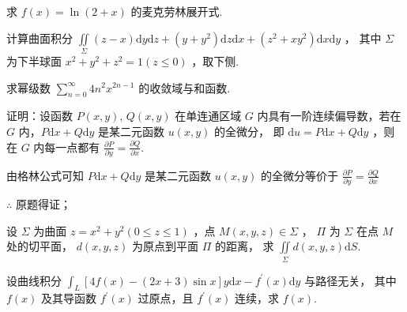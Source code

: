 \begin{problem}[points = 8]
求 $f(x) = \ln{(2 + x)}$ 的麦克劳林展开式.
\end{problem}

\begin{problem}[points = 8]
计算曲面积分 $\iint\limits_\Sigma (z - x)\mathrm{d}y\mathrm{d}z + (y + y^2)\mathrm{d}z\mathrm{d}x + (z^2 + xy^2)\mathrm{d}x\mathrm{d}y$ ，
其中 $\Sigma$ 为下半球面 $x^2 + y^2 + z^2 = 1(z \leq 0)$ ，取下侧.
\end{problem}

\begin{problem}[points = 8]
求幂级数 $\sum\limits_{n = 0}^{\infty} 4n^2x^{2n - 1}$ 的收敛域与和函数.
\end{problem}

\begin{problem}[points = 5]
证明：设函数 $P(x, y),\, Q(x, y)$ 在单连通区域 $G$ 内具有一阶连续偏导数，若在 $G$ 内，$P\mathrm{d}x + Q\mathrm{d}y$ 是某二元函数 $u(x, y)$ 的全微分，
即 $\mathrm{d}u = P\mathrm{d}x + Q\mathrm{d}y$ ，则在 $G$ 内每一点都有 $\frac{\partial P}{\partial y} = \frac{\partial Q}{\partial x}$.
\end{problem}
\begin{solution}
    由格林公式可知 $P\mathrm{d}x + Q\mathrm{d}y$ 是某二元函数 $u(x, y)$ 的全微分等价于 $\frac{\partial P}{\partial y} = \frac{\partial Q}{\partial x}$

    $\therefore$ 原题得证；
\end{solution}

\begin{problem}[points = 6]
设 $\Sigma$ 为曲面 $z = x^2 + y^2(0 \leq z \leq 1)$ ，点 $M(x, y, z) \in \Sigma$ ，
$\Pi$ 为 $\Sigma$ 在点 $M$ 处的切平面， $d(x, y, z)$ 为原点到平面 $\Pi$ 的距离，
求 $\iint\limits_\Sigma d(x, y, z)\mathrm{d}S$.
\end{problem}

\begin{problem}[points = 8]
设曲线积分 $\int_L [4f(x) - (2x + 3)\sin{x}]y\mathrm{d}x - f^{\prime}(x)\mathrm{d}y$ 与路径无关，
其中 $f(x)$ 及其导函数 $f^{\prime}(x)$ 过原点，且 $f^{\prime}(x)$ 连续，求 $f(x)$.
\end{problem}
